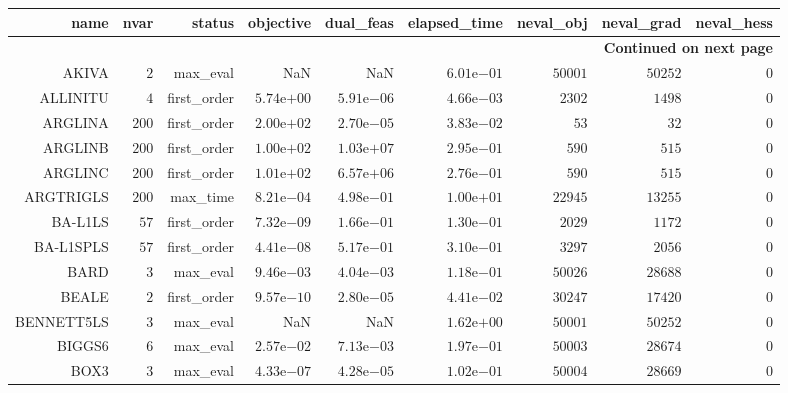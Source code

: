 \begin{longtable}{rrrrrrrrr}
\hline
name & nvar & status & objective & dual\_feas & elapsed\_time & neval\_obj & neval\_grad & neval\_hess \\\hline
\endhead
\hline
\multicolumn{9}{r}{{\bfseries Continued on next page}}\\
\hline
\endfoot
\endlastfoot
AKIVA & \(     2\) & max\_eval &       NaN &       NaN & \( 6.01\)e\(-01\) & \( 50001\) & \( 50252\) & \(     0\) \\
ALLINITU & \(     4\) & first\_order & \( 5.74\)e\(+00\) & \( 5.91\)e\(-06\) & \( 4.66\)e\(-03\) & \(  2302\) & \(  1498\) & \(     0\) \\
ARGLINA & \(   200\) & first\_order & \( 2.00\)e\(+02\) & \( 2.70\)e\(-05\) & \( 3.83\)e\(-02\) & \(    53\) & \(    32\) & \(     0\) \\
ARGLINB & \(   200\) & first\_order & \( 1.00\)e\(+02\) & \( 1.03\)e\(+07\) & \( 2.95\)e\(-01\) & \(   590\) & \(   515\) & \(     0\) \\
ARGLINC & \(   200\) & first\_order & \( 1.01\)e\(+02\) & \( 6.57\)e\(+06\) & \( 2.76\)e\(-01\) & \(   590\) & \(   515\) & \(     0\) \\
ARGTRIGLS & \(   200\) & max\_time & \( 8.21\)e\(-04\) & \( 4.98\)e\(-01\) & \( 1.00\)e\(+01\) & \( 22945\) & \( 13255\) & \(     0\) \\
BA-L1LS & \(    57\) & first\_order & \( 7.32\)e\(-09\) & \( 1.66\)e\(-01\) & \( 1.30\)e\(-01\) & \(  2029\) & \(  1172\) & \(     0\) \\
BA-L1SPLS & \(    57\) & first\_order & \( 4.41\)e\(-08\) & \( 5.17\)e\(-01\) & \( 3.10\)e\(-01\) & \(  3297\) & \(  2056\) & \(     0\) \\
BARD & \(     3\) & max\_eval & \( 9.46\)e\(-03\) & \( 4.04\)e\(-03\) & \( 1.18\)e\(-01\) & \( 50026\) & \( 28688\) & \(     0\) \\
BEALE & \(     2\) & first\_order & \( 9.57\)e\(-10\) & \( 2.80\)e\(-05\) & \( 4.41\)e\(-02\) & \( 30247\) & \( 17420\) & \(     0\) \\
BENNETT5LS & \(     3\) & max\_eval &       NaN &       NaN & \( 1.62\)e\(+00\) & \( 50001\) & \( 50252\) & \(     0\) \\
BIGGS6 & \(     6\) & max\_eval & \( 2.57\)e\(-02\) & \( 7.13\)e\(-03\) & \( 1.97\)e\(-01\) & \( 50003\) & \( 28674\) & \(     0\) \\
BOX3 & \(     3\) & max\_eval & \( 4.33\)e\(-07\) & \( 4.28\)e\(-05\) & \( 1.02\)e\(-01\) & \( 50004\) & \( 28669\) & \(     0\) \\

\end{longtable}
